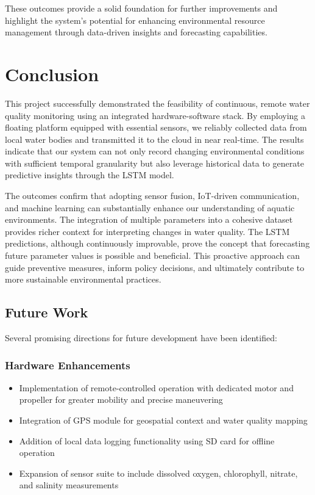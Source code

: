 \documentclass[conference]{IEEEtran}
\begin{document}
These outcomes provide a solid foundation for further improvements and highlight the system's potential for enhancing environmental resource management through data-driven insights and forecasting capabilities.

\section{Conclusion}
This project successfully demonstrated the feasibility of continuous, remote water quality monitoring using an integrated hardware-software stack. By employing a floating platform equipped with essential sensors, we reliably collected data from local water bodies and transmitted it to the cloud in near real-time. The results indicate that our system can not only record changing environmental conditions with sufficient temporal granularity but also leverage historical data to generate predictive insights through the LSTM model.

The outcomes confirm that adopting sensor fusion, IoT-driven communication, and machine learning can substantially enhance our understanding of aquatic environments. The integration of multiple parameters into a cohesive dataset provides richer context for interpreting changes in water quality. The LSTM predictions, although continuously improvable, prove the concept that forecasting future parameter values is possible and beneficial. This proactive approach can guide preventive measures, inform policy decisions, and ultimately contribute to more sustainable environmental practices.

\subsection{Future Work}
Several promising directions for future development have been identified:

\subsubsection{Hardware Enhancements}
\begin{itemize}
\item Implementation of remote-controlled operation with dedicated motor and propeller for greater mobility and precise maneuvering
\item Integration of GPS module for geospatial context and water quality mapping
\item Addition of local data logging functionality using SD card for offline operation
\item Expansion of sensor suite to include dissolved oxygen, chlorophyll, nitrate, and salinity measurements
\end{itemize}
\end{document}
